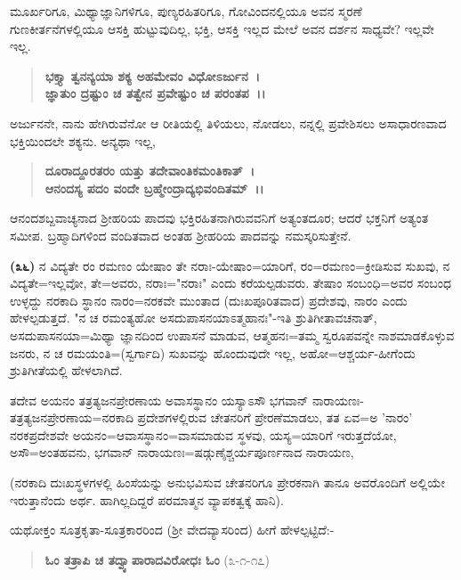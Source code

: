 
ಮೂರ್ಖರಿಗೂ, ಮಿಥ್ಯಾಜ್ಞಾನಿಗಳಿಗೂ, ಪುಣ್ಯರಹಿತರಿಗೂ, ಗೋವಿಂದನಲ್ಲಿಯೂ ಅವನ ಸ್ಮರಣೆ ಗುಣಕೀರ್ತನೆಗಳಲ್ಲಿಯೂ ಆಸಕ್ತಿ ಹುಟ್ಟುವುದಿಲ್ಲ, ಭಕ್ತಿ, ಆಸಕ್ತಿ ಇಲ್ಲದ ಮೇಲೆ ಅವನ ದರ್ಶನ ಸಾಧ್ಯವೇ? ಇಲ್ಲವೇ ಇಲ್ಲ.

\begin{verse}
\textbf{ಭಕ್ತ್ಯಾ ತ್ವನನ್ಯಯಾ ಶಕ್ಯ ಅಹಮೇವಂ ವಿಧೋಽರ್ಜುನ~।}\\\textbf{ಜ್ಞಾತುಂ ದ್ರಷ್ಟುಂ ಚ ತತ್ವೇನ ಪ್ರವೇಷ್ಟುಂ ಚ ಪರಂತಪ~।।}
\end{verse}


ಅರ್ಜುನನೇ, ನಾನು ಹೇಗಿರುವೆನೋ ಆ ರೀತಿಯಲ್ಲಿ ತಿಳಿಯಲು, ನೋಡಲು, ನನ್ನಲ್ಲಿ ಪ್ರವೇಶಿಸಲು ಅಸಾಧಾರಣವಾದ ಭಕ್ತಿಯಿಂದಲೇ ಶಕ್ಯನು. ಅನ್ಯಥಾ ಇಲ್ಲ,

\begin{verse}
\textbf{ದೂರಾದ್ದೂರತರಂ ಯತ್ತು ತದೇವಾಂತಿಕಮಂತಿಕಾತ್~।}\\\textbf{ಆನಂದಸ್ಯ ಪದಂ ವಂದೇ ಬ್ರಹ್ಮೇಂದ್ರಾದ್ಯಭಿವಂದಿತಮ್~।।}
\end{verse}


ಆನಂದಶಬ್ದವಾಚ್ಯನಾದ ಶ‍್ರೀಹರಿಯ ಪಾದವು ಭಕ್ತಿರಹಿತನಾಗಿರುವವನಿಗೆ ಅತ್ಯಂತದೂರ; ಆದರೆ ಭಕ್ತನಿಗೆ ಅತ್ಯಂತ ಸಮೀಪ. ಬ್ರಹ್ಮಾದಿಗಳಿಂದ ವಂದಿತವಾದ ಅಂತಹ ಶ‍್ರೀಹರಿಯ ಪಾದವನ್ನು ನಮಸ್ಕರಿಸುತ್ತೇನೆ.

\textbf{(೩೬)} ನ ವಿದ್ಯತೇ ರಂ ರಮಣಂ ಯೇಷಾಂ ತೇ ನರಾಃ-ಯೇಷಾಂ=ಯಾರಿಗೆ, ರಂ=ರಮಣಂ=ಕ್ರೀಡಿಸುವ ಸುಖವು, ನ ವಿದ್ಯತೇ=ಇಲ್ಲವೋ, ತೇ=ಅವರು, ನರಾಃ="ನರಾಃ" ಎಂದು ಕರೆಯಲ್ಪಡುವರು. ತೇಷಾಂ ಸಂಬಂಧಿ=ಅವರ ಸಂಬಂಧ ಉಳ್ಳದ್ದು ನರಕಾದಿ ಸ್ಥಾನಂ ನಾರಂ=ನರಕವೇ ಮುಂತಾದ (ದುಃಖಪೂರಿತವಾದ) ಪ್ರದೇಶವು, ನಾರಂ ಎಂದು ಹೇಳಲ್ಪಡುತ್ತದೆ. "ನ ಚ ರಮಂತ್ಯಹೋ ಅಸದುಪಾಸನಯಾಽತ್ಮಹಾನಃ"-ಇತಿ ಶ್ರುತಿಗೀತಾವಚನಾತ್, ಅಸದುಪಾಸನಯಾ=ಮಿಥ್ಯಾ ಜ್ಞಾನದಿಂದ ಉಪಾಸನೆ ಮಾಡುವ, ಆತ್ಮಹನಃ=ತಮ್ಮ ಸ್ವರೂಪವನ್ನೇ ನಾಶಮಾಡಕೊಳ್ಳುವ ಜನರು, ನ ಚ ರಮಯಂತಿ=(ಸ್ವರ್ಗಾದಿ) ಸುಖವನ್ನು ಹೊಂದುವುದೇ ಇಲ್ಲ, ಅಹೋ=ಆಶ್ಚರ್ಯ-ಹೀಗೆಂದು ಶ್ರುತಿಗೀತೆಯಲ್ಲಿ ಹೇಳಲಾಗಿದೆ.

ತದೇವ ಅಯನಂ ತತ್ರತ್ಯಜನಪ್ರೇರಣಾಯ ಅವಾಸಸ್ಥಾನಂ ಯಸ್ಯಾಽಸೌ ಭಗವಾನ್ ನಾರಾಯಣಃ-ತತ್ರತ್ಯಜನಪ್ರೇರಣಾಯ=ನರಕಾದಿ ಪ್ರದೇಶಗಳಲ್ಲಿರುವ ಚೇತನರಿಗೆ ಪ್ರೇರಣೆಮಾಡಲು, ತತ ಏವ=ಅ 'ನಾರಂ' ನರಕಪ್ರದೇಶವೇ ಅಯನಂ=ಆವಾಸಸ್ಥಾನಂ=ವಾಸಮಾಡುವ ಸ್ಥಳವು, ಯಸ್ಯ=ಯಾರಿಗೆ ಇರುತ್ತದೆಯೋ, ಅಸೌ=ಅಂತಹವನು, ಭಗವಾನ್ ನಾರಾಯಣಃ=\-ಷಡ್ಗುಣೈಶ್ಚರ್ಯಪೂರ್ಣನಾದ ನಾರಾಯಣ,

(ನರಕಾದಿ ದುಃಖಸ್ಥಳಗಳಲ್ಲಿ ಹಿಂಸೆಯನ್ನು ಅನುಭವಿಸುವ ಚೇತನರಿಗೂ ಪ್ರೇರಕನಾಗಿ ತಾನೂ ಅವರೊಂದಿಗೆ ಅಲ್ಲಿಯೇ ಇರುತ್ತಾನೆಂದು ಅರ್ಥ. ಹಾಗಿಲ್ಲದಿದ್ದರೆ ಪರಮಾತ್ಮನ ವ್ಯಾಪಕತ್ವಕ್ಕೆ ಹಾನಿ).

ಯಥೋಕ್ತಂ ಸೂತ್ರಕೃತಾ-ಸೂತ್ರಕಾರರಿಂದ (ಶ‍್ರೀ ವೇದವ್ಯಾಸರಿಂದ) ಹೀಗೆ ಹೇಳಲ್ಪಟ್ಟಿದೆ:-

\begin{verse}
\textbf{ಓಂ ತತ್ರಾಪಿ ಚ ತದ್ವ್ಯಾಪಾರಾದವಿರೋಧಃ ಓಂ} (೩-೧-೧೭)
\end{verse}

